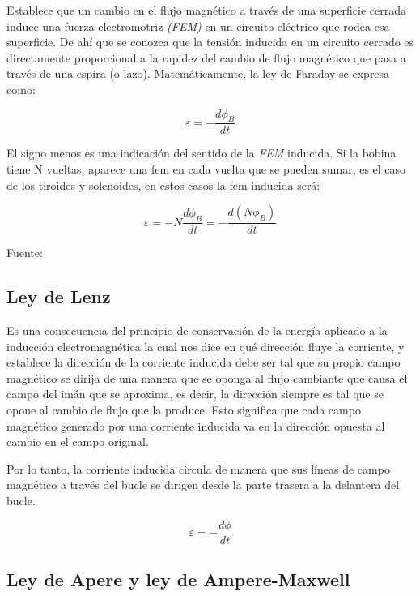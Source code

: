 \documentclass[twocolumn, 12pt]{article}
\begin{document}
Establece que un cambio en el flujo magnético a través de
una superficie cerrada induce una fuerza electromotriz
\textit{(FEM)} en un circuito eléctrico que rodea esa
superficie. De ahí que se conozca que la tensión inducida
en un circuito cerrado es directamente proporcional a la
rapidez del cambio de flujo magnético que pasa a través de
una espira (o lazo). Matemáticamente, la ley de Faraday se
expresa como:

{\Huge
\begin{equation}
	\varepsilon = - \frac{d \phi_B}{dt}
\end{equation}
}

El signo menos es una indicación del sentido de la
\textit{FEM} inducida. Si la bobina tiene N vueltas,
aparece una fem en cada vuelta que se pueden sumar, es el
caso de los tiroides y solenoides, en estos casos la fem
inducida será:

{\large
\begin{equation}
	\varepsilon = - N \frac{d \phi_B}{dt} = - \frac{d (N \phi_B)}{dt}
\end{equation}
}

Fuente:~\cite{CorderoElectromagnetismo}

\subsection*{Ley de Lenz}

Es una consecuencia del principio de conservación de la
energía aplicado a la inducción electromagnética la cual
nos dice en qué dirección fluye la corriente, y establece
la dirección de la corriente inducida debe ser tal que su
propio campo magnético se dirija de una manera que se
oponga al flujo cambiante que causa el campo del imán que
se aproxima, es decir, la dirección siempre es tal que se
opone al cambio de flujo que la produce. Esto significa que
cada campo magnético generado por una corriente inducida va
en la dirección opuesta al cambio en el campo original.

Por lo tanto, la corriente inducida circula de manera que
sus líneas de campo magnético a través del bucle se dirigen
desde la parte trasera a la delantera del bucle.

	{\Large
		\begin{equation}
			\varepsilon = - \frac{d \phi}{dt}
		\end{equation}
	}

\subsection*{Ley de Apere y ley de Ampere-Maxwell}
\end{document}
